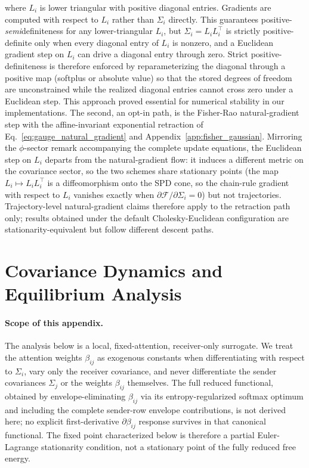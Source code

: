 \documentclass[11pt]{article}
\begin{document}
where $L_i$ is lower triangular with positive diagonal entries. Gradients are computed with respect to $L_i$ rather than $\Sigma_i$ directly. This guarantees positive-\emph{semi}definiteness for any lower-triangular $L_i$, but $\Sigma_i = L_iL_i^\top$ is strictly positive-definite only when every diagonal entry of $L_i$ is nonzero, and a Euclidean gradient step on $L_i$ can drive a diagonal entry through zero. Strict positive-definiteness is therefore enforced by reparameterizing the diagonal through a positive map (softplus or absolute value) so that the stored degrees of freedom are unconstrained while the realized diagonal entries cannot cross zero under a Euclidean step. This approach proved essential for numerical stability in our implementations. The second, an opt-in path, is the Fisher-Rao natural-gradient step with the affine-invariant exponential retraction of Eq.~\eqref{eq:gauge_natural_gradient} and Appendix~\ref{app:fisher_gaussian}. Mirroring the $\phi$-sector remark accompanying the complete update equations, the Euclidean step on $L_i$ departs from the natural-gradient flow: it induces a different metric on the covariance sector, so the two schemes share stationary points (the map $L_i \mapsto L_iL_i^\top$ is a diffeomorphism onto the SPD cone, so the chain-rule gradient with respect to $L_i$ vanishes exactly when $\partial\mathcal{F}/\partial\Sigma_i = 0$) but not trajectories. Trajectory-level natural-gradient claims therefore apply to the retraction path only; results obtained under the default Cholesky-Euclidean configuration are stationarity-equivalent but follow different descent paths.

\section{Covariance Dynamics and Equilibrium Analysis}
\label{app:covariance_dynamics}

\paragraph{Scope of this appendix.}
The analysis below is a local, fixed-attention, receiver-only surrogate. We treat the attention weights $\beta_{ij}$ as exogenous constants when differentiating with respect to $\Sigma_i$, vary only the receiver covariance, and never differentiate the sender covariances $\Sigma_j$ or the weights $\beta_{ij}$ themselves. The full reduced functional, obtained by envelope-eliminating $\beta_{ij}$ via its entropy-regularized softmax optimum and including the complete sender-row envelope contributions, is not derived here; no explicit first-derivative $\partial\beta_{ij}$ response survives in that canonical functional. The fixed point characterized below is therefore a partial Euler-Lagrange stationarity condition, not a stationary point of the fully reduced free energy.
\end{document}
